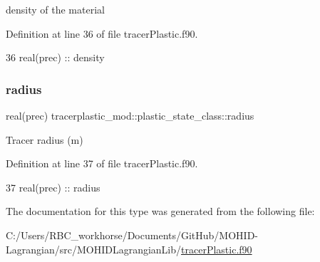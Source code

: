density of the material 



Definition at line 36 of file tracer\+Plastic.\+f90.


\begin{DoxyCode}
36         \textcolor{keywordtype}{real(prec)} :: density
\end{DoxyCode}
\mbox{\label{structtracerplastic__mod_1_1plastic__state__class_adcabfc8dd732395f9721677448baf4c0}} 
\subsubsection{\texorpdfstring{radius}{radius}}
{\footnotesize\ttfamily real(prec) tracerplastic\+\_\+mod\+::plastic\+\_\+state\+\_\+class\+::radius\hspace{0.3cm}{\ttfamily [private]}}



Tracer radius (m) 



Definition at line 37 of file tracer\+Plastic.\+f90.


\begin{DoxyCode}
37         \textcolor{keywordtype}{real(prec)} :: radius
\end{DoxyCode}


The documentation for this type was generated from the following file\+:\begin{DoxyCompactItemize}
\item 
C\+:/\+Users/\+R\+B\+C\+\_\+workhorse/\+Documents/\+Git\+Hub/\+M\+O\+H\+I\+D-\/\+Lagrangian/src/\+M\+O\+H\+I\+D\+Lagrangian\+Lib/\mbox{\hyperlink{tracer_plastic_8f90}{tracer\+Plastic.\+f90}}\end{DoxyCompactItemize}
